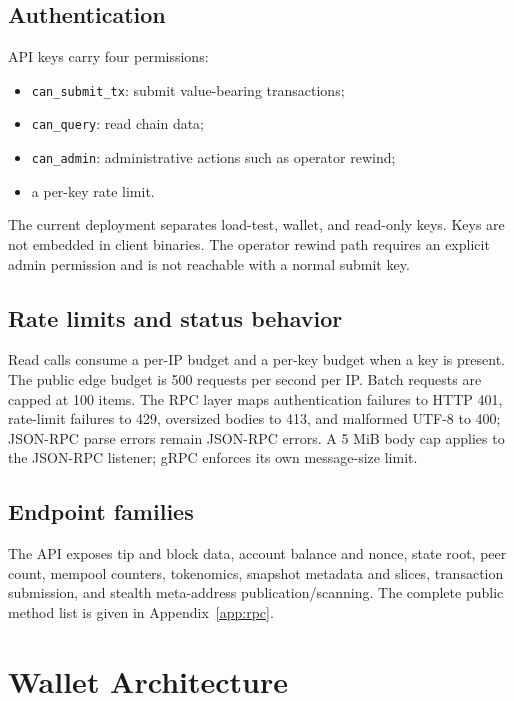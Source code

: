 \documentclass[11pt,a4paper]{article}
\begin{document}
\subsection{Authentication}

API keys carry four permissions:
\begin{itemize}[leftmargin=*]
  \item \texttt{can\_submit\_tx}: submit value-bearing transactions;
  \item \texttt{can\_query}: read chain data;
  \item \texttt{can\_admin}: administrative actions such as operator rewind;
  \item a per-key rate limit.
\end{itemize}

The current deployment separates load-test, wallet, and read-only keys. Keys
are not embedded in client binaries. The operator rewind path requires an
explicit admin permission and is not reachable with a normal submit key.

\subsection{Rate limits and status behavior}

Read calls consume a per-IP budget and a per-key budget when a key is present.
The public edge budget is 500 requests per second per IP. Batch requests are
capped at 100 items. The RPC layer maps authentication failures to HTTP 401,
rate-limit failures to 429, oversized bodies to 413, and malformed UTF-8 to
400; JSON-RPC parse errors remain JSON-RPC errors. A 5 MiB body cap applies to
the JSON-RPC listener; gRPC enforces its own message-size limit.

\subsection{Endpoint families}

The API exposes tip and block data, account balance and nonce, state root,
peer count, mempool counters, tokenomics, snapshot metadata and slices,
transaction submission, and stealth meta-address publication/scanning. The
complete public method list is given in Appendix~\ref{app:rpc}.

\section{Wallet Architecture}
\end{document}
